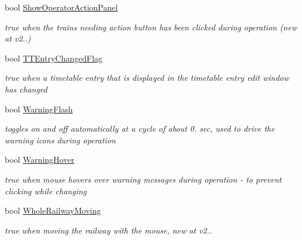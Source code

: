 \begin{DoxyCompactItemize}
\mbox{\label{class_t_interface_abe13c4fbf81da4b1d11723cf0ce7473a}} 
bool \mbox{\hyperlink{class_t_interface_abe13c4fbf81da4b1d11723cf0ce7473a}{Show\+Operator\+Action\+Panel}}
\begin{DoxyCompactList}\small\item\em true when the \textquotesingle{}trains needing action\textquotesingle{} button has been clicked during operation (new at v2..) \end{DoxyCompactList}\item 
\mbox{\label{class_t_interface_a615a33846b3930ea4691e786912c2ce0}} 
bool \mbox{\hyperlink{class_t_interface_a615a33846b3930ea4691e786912c2ce0}{T\+T\+Entry\+Changed\+Flag}}
\begin{DoxyCompactList}\small\item\em true when a timetable entry that is displayed in the timetable entry edit window has changed \end{DoxyCompactList}\item 
\mbox{\label{class_t_interface_a62422649dfbc50527056fc4c2979f270}} 
bool \mbox{\hyperlink{class_t_interface_a62422649dfbc50527056fc4c2979f270}{Warning\+Flash}}
\begin{DoxyCompactList}\small\item\em toggles on and off automatically at a cycle of about 0. sec, used to drive the warning icons during operation \end{DoxyCompactList}\item 
\mbox{\label{class_t_interface_a928b389995d7601e79e0114f400e21f6}} 
bool \mbox{\hyperlink{class_t_interface_a928b389995d7601e79e0114f400e21f6}{Warning\+Hover}}
\begin{DoxyCompactList}\small\item\em true when mouse hovers over warning messages during operation -\/ to prevent clicking while changing \end{DoxyCompactList}\item 
\mbox{\label{class_t_interface_a374697196f54a38d8a1fd6cfabb5a8a4}} 
bool \mbox{\hyperlink{class_t_interface_a374697196f54a38d8a1fd6cfabb5a8a4}{Whole\+Railway\+Moving}}
\begin{DoxyCompactList}\small\item\em true when moving the railway with the mouse, new at v2.. \end{DoxyCompactList}\item 

\end{DoxyCompactItemize}
